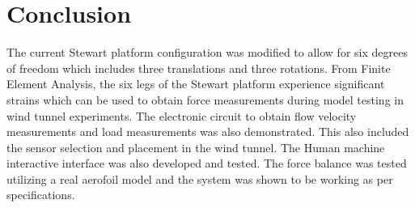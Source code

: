 \section{Conclusion}
The current Stewart platform configuration was modified to allow for six degrees of freedom which includes three translations and three rotations.
From Finite Element Analysis, the six legs of the Stewart platform experience significant strains which can be used to obtain force measurements during model testing in wind tunnel experiments.
The electronic circuit to obtain flow velocity measurements and load measurements was also demonstrated. This also included the sensor selection and placement in the wind tunnel.
The Human machine interactive interface was also developed and tested.
The force balance was tested utilizing a real aerofoil model and the system was shown to be working as per specifications.